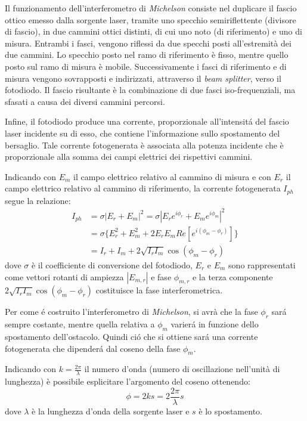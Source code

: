 Il funzionamento dell'interferometro di \textit{Michelson} consiste nel duplicare il fascio ottico emesso dalla sorgente laser, tramite uno specchio semiriflettente (divisore di fascio), in due cammini ottici distinti, di cui uno noto (di riferimento) e uno di misura. Entrambi i fasci, vengono riflessi da due specchi posti all'estremità dei due cammini. Lo specchio posto nel ramo di riferimento è fisso, mentre quello posto sul ramo di misura è mobile. Successivamente i fasci di riferimento e di misura vengono sovrapposti e indirizzati, attraverso il \textit{beam splitter}, verso il fotodiodo. Il fascio risultante è la combinazione di due fasci iso-frequenziali, ma sfasati a causa dei diversi cammini percorsi.

Infine, il fotodiodo produce una corrente, proporzionale all'intensitá del fascio laser incidente su di esso, che contiene l'informazione sullo spostamento del bersaglio. Tale corrente fotogenerata è associata alla potenza incidente che è proporzionale alla somma dei campi elettrici dei rispettivi cammini.

Indicando con ${E_m}$ il campo elettrico relativo al cammino di misura e con ${E_r}$ il campo elettrico relativo al cammino di riferimento, la corrente fotogenerata $I_{ph}$ segue la relazione:
\begin{equation}
\begin{split}
	I_{ph}&=\sigma|E_r+E_m|^2=\sigma|E_re^{i\phi_r}+E_me^{i\phi_m}|^2\\
	&=\sigma\{E_r^2+E_m^2+2E_rE_mRe[e^{i(\phi_m-\phi_r)}]\}\\
	&=I_r+I_m+2\sqrt{I_rI_m}\cos{(\phi_m-\phi_r)}
\end{split}
\end{equation}
dove $\sigma$ è il coefficiente di conversione del fotodiodo, $E_r$ e $E_m$ sono rappresentati come vettori rotanti di ampiezza $|E_{m,r}|$ e fase $\phi_{m,r}$ e la terza componente $2\sqrt{I_rI_m}\cos{(\phi_m-\phi_r)}$ costituisce la fase interferometrica. 

Per come é costruito l'interferometro di \textit{Michelson}, si avrà che la fase $\phi_r$ sará sempre costante, mentre quella relativa a $\phi_m$ varierá in funzione dello spostamento dell'ostacolo. Quindi ció che si ottiene sará una corrente fotogenerata che dipenderá dal coseno della fase $\phi_m$. 

Indicando con $k=\frac{2\pi}{\lambda}$ il numero d'onda (numero di oscillazione nell'unità di lunghezza) è possibile esplicitare l'argomento del coseno ottenendo:
\begin{equation}
	\phi=2ks=2\frac{2\pi}{\lambda}s	
\end{equation}
dove $\lambda$ è la lunghezza d'onda della sorgente laser e $s$ è lo spostamento.


